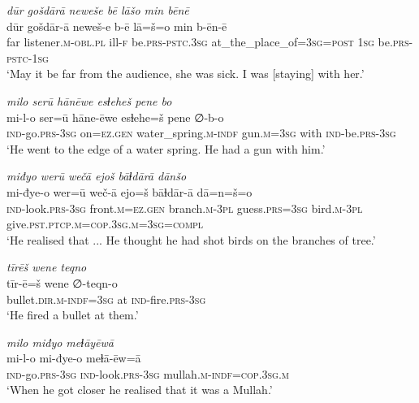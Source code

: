 \ea \label{KŠ.2}
\textit{dūr gošdārā neweše bē lāšo min bēnē} \\ 
\gll dūr gošdār-ā neweš-e b-ē lā=š=o min b-ēn-ē \\ 
 far listener\textsc{.m}\textsc{-obl}\textsc{.pl} ill\textsc{-f} be\textsc{.prs}\textsc{-pstc}\textsc{.3sg} at\_the\_place\_of\textsc{=3sg}\textsc{=\textsc{post}} \textsc{1sg} be\textsc{.prs}\textsc{-pstc}\textsc{-\textsc{1sg}} \\ 
\glt `May it be far from the audience, she was sick. I was [staying] with her.'
\z 
 
\ea \label{KŠ.4}
\textit{milo serū hānēwe esɫeheš pene bo} \\ 
\gll mi-l-o ser=ū hāne-ēwe esɫehe=š pene ∅-b-o \\ 
 \textsc{ind-}go\textsc{.prs}\textsc{-3sg} on\textsc{=ez.gen} water\_spring\textsc{.m}\textsc{-indf} gun\textsc{.m}\textsc{=3sg} with \textsc{ind-}be\textsc{.prs}\textsc{-3sg} \\ 
\glt `He went to the edge of a water spring. He had a gun with him.'
\z 
 
\ea \label{KŠ.5}
\textit{miđyo werū wečā ejoš bāɫdārā dānšo} \\ 
\gll mi-đye-o wer=ū weč-ā ejo=š bāɫdār-ā dā=n=š=o \\ 
 \textsc{ind-}look\textsc{.prs}\textsc{-3sg} front\textsc{.m}\textsc{=ez.gen} branch\textsc{.m}\textsc{-3pl} guess\textsc{.prs}\textsc{=3sg} bird\textsc{.m}\textsc{-3pl} give\textsc{.pst}\textsc{.ptcp}\textsc{.m}\textsc{=cop}\textsc{.3sg}\textsc{.m}\textsc{=3sg}\textsc{=compl} \\ 
\glt `He realised that ... He thought he had shot birds on the branches of tree.'
\z 
 
\ea \label{KŠ.6}
\textit{tīrēš wene teqno} \\ 
\gll tīr-ē=š wene ∅-teqn-o \\ 
 bullet\textsc{.dir}\textsc{.m}\textsc{-indf}\textsc{=3sg} at \textsc{ind-}fire\textsc{.prs}\textsc{-3sg} \\ 
\glt `He fired a bullet at them.'
\z 
 
\ea \label{KŠ.7}
\textit{milo miđyo meɫāyēwā} \\ 
\gll mi-l-o mi-đye-o meɫā-ēw=ā \\ 
 \textsc{ind-}go\textsc{.prs}\textsc{-3sg} \textsc{ind-}look\textsc{.prs}\textsc{-3sg} mullah\textsc{.m}\textsc{-indf}\textsc{=cop}\textsc{.3sg}\textsc{.m} \\ 
\glt `When he got closer he realised that it was a Mullah.'
\z 
 
